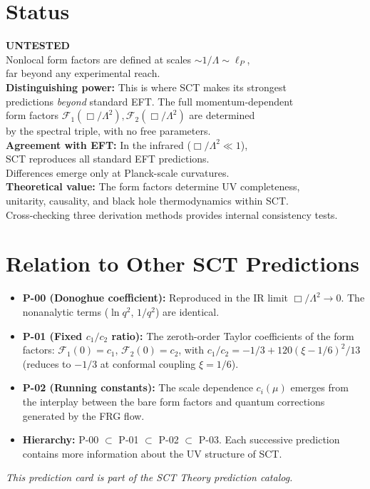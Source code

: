 \documentclass[11pt,a4paper]{article}
\begin{document}
\section{Status}

\begin{center}
\colorbox{untested!15}{\parbox{0.85\textwidth}{\centering
  \textbf{\color{untested}\Large UNTESTED}\\[6pt]
  Nonlocal form factors are defined at scales $\sim 1/\Lambda \sim \ell_P$,\\
  far beyond any experimental reach.\\[4pt]
  \textbf{Distinguishing power:} This is where SCT makes its strongest\\
  predictions \emph{beyond} standard EFT. The full momentum-dependent\\
  form factors $\mathcal{F}_1(\Box/\Lambda^2), \mathcal{F}_2(\Box/\Lambda^2)$ are determined\\
  by the spectral triple, with no free parameters.\\[4pt]
  \textbf{Agreement with EFT:} In the infrared ($\Box/\Lambda^2 \ll 1$),\\
  SCT reproduces all standard EFT predictions.\\
  Differences emerge only at Planck-scale curvatures.\\[4pt]
  \textbf{Theoretical value:} The form factors determine UV completeness,\\
  unitarity, causality, and black hole thermodynamics within SCT.\\
  Cross-checking three derivation methods provides internal consistency tests.
}}
\end{center}

\section{Relation to Other SCT Predictions}

\begin{itemize}[leftmargin=2em]
  \item \textbf{P-00 (Donoghue coefficient):} Reproduced in the IR limit $\Box/\Lambda^2 \to 0$. The nonanalytic terms ($\ln q^2$, $1/q^2$) are identical.
  \item \textbf{P-01 (Fixed $c_1/c_2$ ratio):} The zeroth-order Taylor coefficients of the form factors: $\mathcal{F}_1(0) = c_1$, $\mathcal{F}_2(0) = c_2$, with $c_1/c_2 = -1/3 + 120(\xi-1/6)^2/13$ (reduces to $-1/3$ at conformal coupling $\xi = 1/6$).
  \item \textbf{P-02 (Running constants):} The scale dependence $c_i(\mu)$ emerges from the interplay between the bare form factors and quantum corrections generated by the FRG flow.
  \item \textbf{Hierarchy:} P-00 $\subset$ P-01 $\subset$ P-02 $\subset$ P-03. Each successive prediction contains more information about the UV structure of SCT.
\end{itemize}

\vspace{1em}
\noindent
\textit{This prediction card is part of the SCT Theory prediction catalog.}
\end{document}
